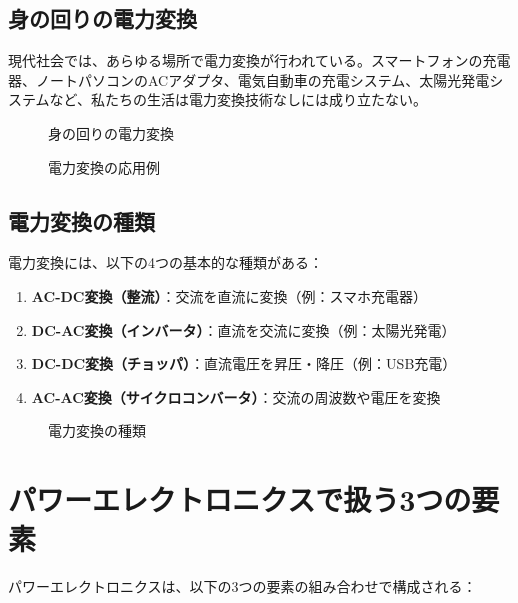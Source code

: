 \subsection{身の回りの電力変換}

現代社会では、あらゆる場所で電力変換が行われている。スマートフォンの充電器、ノートパソコンのACアダプタ、電気自動車の充電システム、太陽光発電システムなど、私たちの生活は電力変換技術なしには成り立たない。

\begin{figure}[H]
\centering
{}
\caption{身の回りの電力変換}
\label{fig:power_conversion_examples}
\end{figure}

\begin{figure}[H]
\centering
{}
\caption{電力変換の応用例}
\label{fig:applications}
\end{figure}

\subsection{電力変換の種類}

電力変換には、以下の4つの基本的な種類がある：

\begin{enumerate}
\item \textbf{AC-DC変換（整流）}：交流を直流に変換（例：スマホ充電器）
\item \textbf{DC-AC変換（インバータ）}：直流を交流に変換（例：太陽光発電）
\item \textbf{DC-DC変換（チョッパ）}：直流電圧を昇圧・降圧（例：USB充電）
\item \textbf{AC-AC変換（サイクロコンバータ）}：交流の周波数や電圧を変換
\end{enumerate}

\begin{figure}[H]
\centering
{}
\caption{電力変換の種類}
\label{fig:conversion_types}
\end{figure}

\section{パワーエレクトロニクスで扱う3つの要素}

パワーエレクトロニクスは、以下の3つの要素の組み合わせで構成される：


